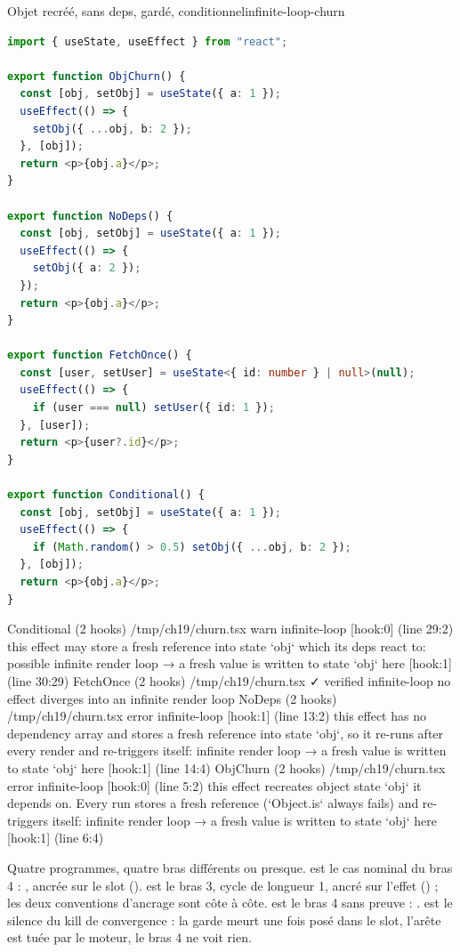 \begin{exemple}{Objet recréé, sans deps, gardé, conditionnel}{infinite-loop-churn}
\begin{lstlisting}[language=TypeScript,caption={\file{/tmp/ch19/churn.tsx}},label={lst:infinite-loop-churn}]
import { useState, useEffect } from "react";

export function ObjChurn() {
  const [obj, setObj] = useState({ a: 1 });
  useEffect(() => {
    setObj({ ...obj, b: 2 });
  }, [obj]);
  return <p>{obj.a}</p>;
}

export function NoDeps() {
  const [obj, setObj] = useState({ a: 1 });
  useEffect(() => {
    setObj({ a: 2 });
  });
  return <p>{obj.a}</p>;
}

export function FetchOnce() {
  const [user, setUser] = useState<{ id: number } | null>(null);
  useEffect(() => {
    if (user === null) setUser({ id: 1 });
  }, [user]);
  return <p>{user?.id}</p>;
}

export function Conditional() {
  const [obj, setObj] = useState({ a: 1 });
  useEffect(() => {
    if (Math.random() > 0.5) setObj({ ...obj, b: 2 });
  }, [obj]);
  return <p>{obj.a}</p>;
}
\end{lstlisting}
\begin{sortie}
  Conditional  (2 hooks)  /tmp/ch19/churn.tsx
    warn   infinite-loop  [hook:0]  (line 29:2)  this effect may store a fresh reference into state `obj` which its deps react to: possible infinite render loop
       → a fresh value is written to state `obj` here [hook:1] (line 30:29)
  FetchOnce  (2 hooks)  /tmp/ch19/churn.tsx  ✓
    verified  infinite-loop  no effect diverges into an infinite render loop
  NoDeps  (2 hooks)  /tmp/ch19/churn.tsx
    error  infinite-loop  [hook:1]  (line 13:2)  this effect has no dependency array and stores a fresh reference into state `obj`, so it re-runs after every render and re-triggers itself: infinite render loop
       → a fresh value is written to state `obj` here [hook:1] (line 14:4)
  ObjChurn  (2 hooks)  /tmp/ch19/churn.tsx
    error  infinite-loop  [hook:0]  (line 5:2)  this effect recreates object state `obj` it depends on. Every run stores a fresh reference (`Object.is` always fails) and re-triggers itself: infinite render loop
       → a fresh value is written to state `obj` here [hook:1] (line 6:4)
\end{sortie}
\end{exemple}

Quatre programmes, quatre bras différents ou presque.  est le cas nominal du bras 4 : \Error, ancrée sur le slot (\code{[hook:0]}).  est le bras 3, cycle de longueur 1, ancré sur l'effet (\code{[hook:1]}) ; les deux conventions d'ancrage sont côte à côte.  est le bras 4 sans preuve : \Warning.  est le silence du kill de convergence : la garde  meurt une fois  posé dans le slot, l'arête est tuée par le moteur, le bras 4 ne voit rien.

